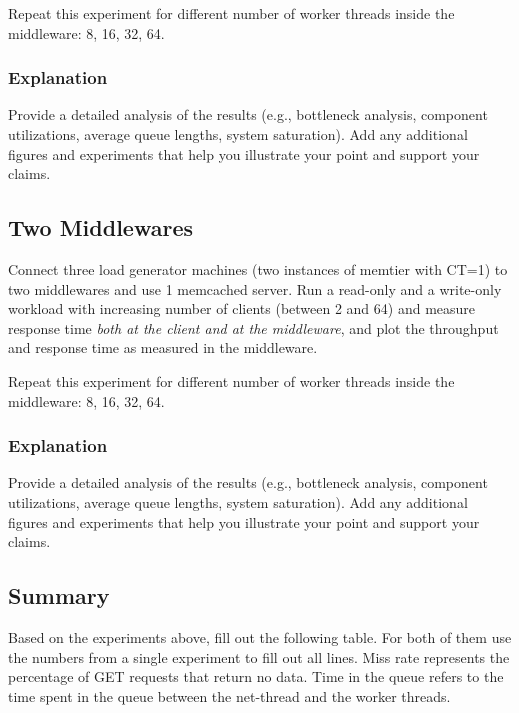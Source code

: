 Repeat this experiment for different number of worker threads inside the middleware: 8, 16, 32, 64.

        \subsubsection{Explanation\label{subsubsec:3_one-middleware_summary}}

        Provide a detailed analysis of the results (e.g., bottleneck analysis, component utilizations, average queue lengths, system saturation). Add any additional figures and experiments that help you illustrate your point and support your claims.

    \subsection{Two Middlewares\label{subsec:3_two-middlewares}}

    Connect three load generator machines (two instances of memtier with CT=1) to two middlewares and use 1 memcached server. Run a read-only and a write-only workload with increasing number of clients (between 2 and 64) and measure response time \emph{both at the client and at the middleware}, and plot the throughput and response time as measured in the middleware.

    Repeat this experiment for different number of worker threads inside the middleware: 8, 16, 32, 64.

        \subsubsection{Explanation\label{subsubsec:3_two-middlewares_summary}}

        Provide a detailed analysis of the results (e.g., bottleneck analysis, component utilizations, average queue lengths, system saturation). Add any additional figures and experiments that help you illustrate your point and support your claims.

    \subsection{Summary\label{subsec;3_summary}}

    Based on the experiments above, fill out the following table. For both of them use the numbers from a single experiment to fill out all lines. Miss rate represents the percentage of GET requests that return no data. Time in the queue refers to the time spent in the queue between the net-thread and the worker threads.

